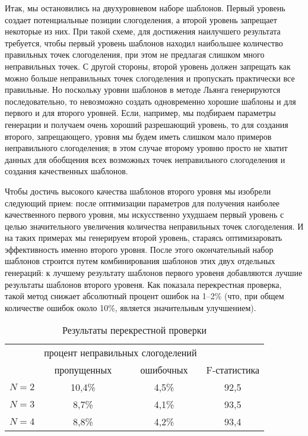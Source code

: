 \documentclass[12pt,a4paper,oneside]{extarticle}
\begin{document}
Итак, мы остановились на двухуровневом наборе шаблонов. Первый уровень создает потенциальные позиции слогоделения, а второй уровень запрещает некоторые из них. При такой схеме, для достижения наилучшего результата требуется, чтобы первый уровень шаблонов находил наибольшее количество правильных точек слогоделения, при этом не предлагая слишком много неправильных точек. С другой стороны, второй уровень должен запрещать как можно больше неправильных точек слогоделения и пропускать практически все правильные. Но поскольку уровни шаблонов в методе Льянга генерируются последовательно, то невозможно создать одновременно хорошие шаблоны и для первого и для второго уровней. Если, например, мы подбираем параметры генерации и получаем очень хороший разрешающий уровень, то для создания второго, запрещающего, уровня мы будем иметь слишком мало примеров неправильного слогоделения; в этом случае второму уровню просто не хватит данных для обобщения всех возможных точек неправильного слогоделения и создания качественных шаблонов. %

Чтобы достичь высокого качества шаблонов второго уровня мы изобрели следующий прием: после оптимизации параметров для получения наиболее качественного первого уровня, мы искусственно ухудшаем первый уровень с целью значительного увеличения количества неправильных точек слогоделения. И на таких примерах мы генерируем второй уровень, стараясь оптимизаровать эффективность именно второго уровня. После этого окончательный набор шаблонов строится путем комбинирования шаблонов этих двух отдельных генераций: к лучшему результату шаблонов первого уровеня добавляются лучшие результаты шаблонов второго уровеня. Как показала перекрестная проверка, такой метод снижает абсолютный процент ошибок на 1--2\% (что, при общем количестве ошибок около 10\%, является значительным улучшением).

\begin{table}[ht]
\centering
\caption{Результаты перекрестной проверки \label{validation_results}}
\begin{tabular}{cccc}
		&	\multicolumn{2}{c}{процент неправильных слогоделений} & \\
		&	пропущенных		& ошибочных	& F-статистика \\
\hline
$N = 2$	& 	10,4\%			& 	4,5\% 	&	92,5 \\
$N = 3$ 	& 	8,7\%			& 	4,1\% 	& 	93,5	\\
$N = 4$ 	&	8,8\%			& 	4,2\% 	& 	93,4	\\
\hline
\end{tabular}
\end{table}
\end{document}
